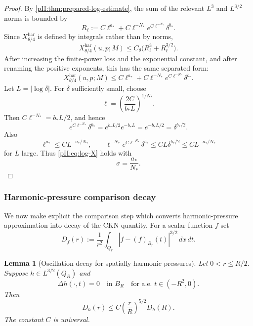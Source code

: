 \documentclass[11pt]{article}
\numberwithin{equation}{section}
\theoremstyle{plain}
\newtheorem{lemma}{Lemma}[section]
\theoremstyle{definition}
\theoremstyle{remark}
\newcommand{\har}{\mathrm{har}}
\newcommand{\dxdt}{\,dx\,dt}
\begin{document}
\begin{proof}
By \cref{pII:thm:prepared-log-estimate}, the sum of the relevant \(L^3\) and \(L^{3/2}\) norms is bounded by
\[
        R_\ell:=C\ell^{a_*}+C\ell^{-N_*}e^{C\ell^{-N_*}}\delta^{b_*}.
\]
Since \(X_{\theta/4}^{\har}\) is defined by integrals rather than by norms,
\[
        X_{\theta/4}^{\har}(u,p;M)\le C_\theta\bigl(R_\ell^3+R_\ell^{3/2}\bigr).
\]
After increasing the finite-power loss and the exponential constant, and after renaming the positive exponents, this has the same separated form:
\[
        X_{\theta/4}^{\har}(u,p;M)
        \le C\ell^{a_*}+C\ell^{-N_*}e^{C\ell^{-N_*}}\delta^{b_*}.
\]
Let $L=|\log\delta|$.  For $\delta$ sufficiently small, choose
\[
        \ell=\left(\frac{2C}{b_*L}\right)^{1/N_*}.
\]
Then $C\ell^{-N_*}=b_*L/2$, and hence
\[
        e^{C\ell^{-N_*}}\delta^{b_*}=e^{b_*L/2}e^{-b_*L}=e^{-b_*L/2}=\delta^{b_*/2}.
\]
Also
\[
        \ell^{a_*}\le C L^{-a_*/N_*},
        \qquad
        \ell^{-N_*}e^{C\ell^{-N_*}}\delta^{b_*}
        \le C L\delta^{b_*/2}
        \le C L^{-a_*/N_*}
\]
for $L$ large.  Thus \eqref{pII:eq:log-X} holds with
\[
        \sigma=\frac{a_*}{N_*}.
\]
\end{proof}


\subsubsection{Harmonic-pressure comparison decay}
\label{pII:subsec:harmonic-pressure-comparison}

We now make explicit the comparison step which converts harmonic-pressure approximation into decay of the CKN quantity.  For a scalar function $f$ set
\[
        D_f(r)
        :=
        \frac{1}{r^2}
        \int_{Q_r}
        |f-(f)_{B_r}(t)|^{3/2}\dxdt .
\]

\begin{lemma}[Oscillation decay for spatially harmonic pressures]
\label{pII:lem:harmonic-oscillation-decay}
Let $0<r\le R/2$.  Suppose $h\in L^{3/2}(Q_R)$ and
\[
        \Delta h(\cdot,t)=0
        \quad\text{in }B_R
        \quad\text{for a.e. }t\in(-R^2,0).
\]
Then
\[
        D_h(r)
        \le
        C\left(\frac{r}{R}\right)^{5/2}D_h(R).
\]
The constant $C$ is universal.
\end{lemma}
\end{document}
